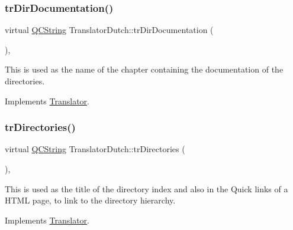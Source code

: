 \mbox{\label{class_translator_dutch_a780d8c7a25dcfda02fe33eb683e3cef5}} 
\subsubsection{\texorpdfstring{trDirDocumentation()}{trDirDocumentation()}}
{\footnotesize\ttfamily virtual \mbox{\hyperlink{class_q_c_string}{Q\+C\+String}} Translator\+Dutch\+::tr\+Dir\+Documentation (\begin{DoxyParamCaption}{ }\end{DoxyParamCaption})\hspace{0.3cm}{\ttfamily [inline]}, {\ttfamily [virtual]}}

This is used as the name of the chapter containing the documentation of the directories. 

Implements \mbox{\hyperlink{class_translator}{Translator}}.

\mbox{\label{class_translator_dutch_a43c7949f587066300f54e6e0c1cc6f39}} 
\subsubsection{\texorpdfstring{trDirectories()}{trDirectories()}}
{\footnotesize\ttfamily virtual \mbox{\hyperlink{class_q_c_string}{Q\+C\+String}} Translator\+Dutch\+::tr\+Directories (\begin{DoxyParamCaption}{ }\end{DoxyParamCaption})\hspace{0.3cm}{\ttfamily [inline]}, {\ttfamily [virtual]}}

This is used as the title of the directory index and also in the Quick links of a H\+T\+ML page, to link to the directory hierarchy. 

Implements \mbox{\hyperlink{class_translator}{Translator}}.

\mbox{\label{class_translator_dutch_a8daeda058cfb5a2a97fe0c387cf3fd2e}} 
